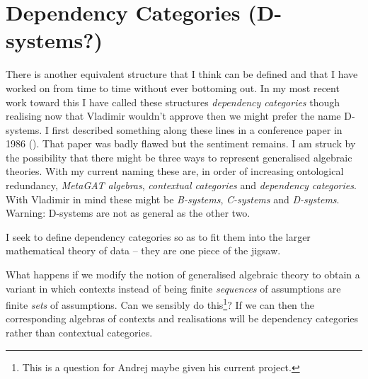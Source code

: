 \documentclass[10pt,a4paper]{article}
\theoremstyle{remark}
\begin{document}
\section{Dependency Categories (D-systems?)}

\note 
There is another equivalent structure that I think can be defined and that I have worked on from time to time without ever bottoming out. In my most recent work toward this I have called these
structures \textit{dependency categories} though realising now that Vladimir wouldn't approve then we might prefer the name D-systems. 
I first described something along these lines in a conference paper in 1986 (\cite{Cartmell86B}). That paper was badly flawed  but the sentiment remains. 
\note
I am struck by the possibility that there might be three ways to represent generalised algebraic theories.
With my current naming these are, in order of increasing ontological redundancy, \textit{MetaGAT algebras}, \textit{contextual categories} and
\textit{dependency categories}. With Vladimir in mind these might be \textit{B-systems}, \textit{C-systems} and \textit{D-systems}. Warning:  D-systems are not  as general as the other two.


\note I seek to define dependency categories so as to fit them into the larger mathematical theory of data -- they are one piece of the jigsaw.

\note What happens if we modify the notion of generalised algebraic theory to obtain a variant in which contexts instead of being finite \textit{sequences} of assumptions are finite \textit{sets} of assumptions. Can we sensibly do this\footnote{This is a question for Andrej maybe given his current project.}? If we can then the corresponding algebras of contexts and realisations will be dependency categories rather than contextual categories.
\end{document}
